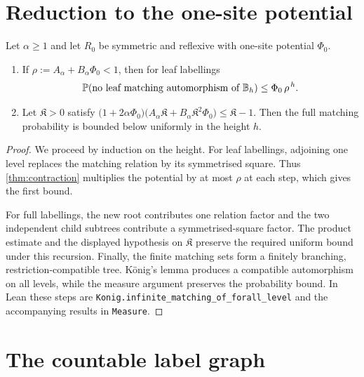 \section{Reduction to the one-site potential}

\begin{theorem}[Reduction]
\label{thm:reduction}
\leanok
{}
Let $\alpha\geq1$ and let $R_0$ be symmetric and reflexive with one-site potential
$\Phi_0$.
\begin{enumerate}
\item If $\rho:=A_\alpha+B_\alpha\Phi_0<1$, then for leaf labellings
\[
 \mathbb{P}(\text{no leaf matching automorphism of }\mathbb{B}_h)\leq\Phi_0\,\rho^{\,h}.
\]
\item Let $\mathfrak K>0$ satisfy
$\bigl(1+2\alpha\Phi_0\bigr)\bigl(A_\alpha\mathfrak K+B_\alpha\mathfrak K^2\Phi_0\bigr)
\leq\mathfrak K-1$. Then the full matching probability is bounded below uniformly in the
height $h$.
\end{enumerate}
\end{theorem}

\begin{proof}
\leanok
{}
We proceed by induction on the height. For leaf labellings, adjoining one level replaces the
matching relation by its symmetrised square. Thus \cref{thm:contraction} multiplies the
potential by at most $\rho$ at each step, which gives the first bound.

For full labellings, the new root contributes one relation factor and the two independent child
subtrees contribute a symmetrised-square factor. The product estimate and the displayed
hypothesis on $\mathfrak K$ preserve the required uniform bound under this recursion. Finally,
the finite matching sets form a finitely branching, restriction-compatible tree. K\"onig's
lemma produces a compatible automorphism on all levels, while the measure argument preserves
the probability bound. In Lean these steps are
\texttt{Konig.infinite\_matching\_of\_forall\_level} and the accompanying results in
\texttt{Measure}.
\end{proof}

\section{The countable label graph}

